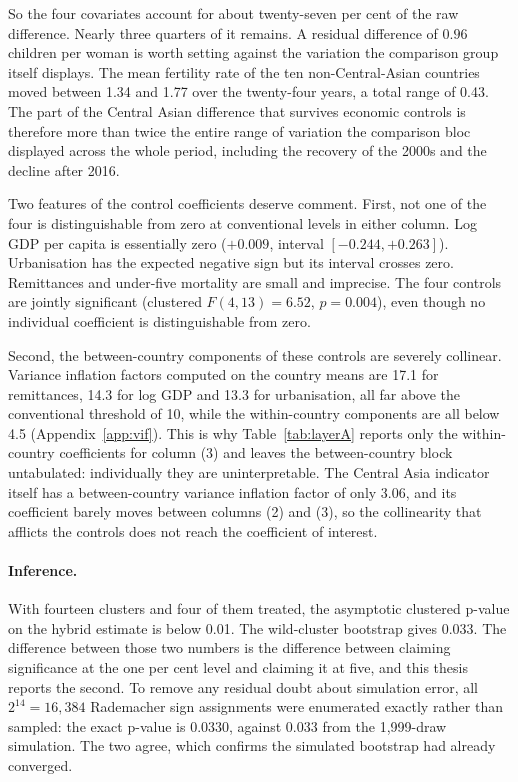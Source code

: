 So the four covariates account for about twenty-seven per cent of the raw difference. Nearly three quarters of it remains. A residual difference of $0.96$ children per woman is worth setting against the variation the comparison group itself displays. The mean fertility rate of the ten non-Central-Asian countries moved between 1.34 and 1.77 over the twenty-four years, a total range of 0.43. The part of the Central Asian difference that survives economic controls is therefore more than twice the entire range of variation the comparison bloc displayed across the whole period, including the recovery of the 2000s and the decline after 2016.

Two features of the control coefficients deserve comment. First, not one of the four is distinguishable from zero at conventional levels in either column. Log GDP per capita is essentially zero ($+0.009$, interval $[-0.244, +0.263]$). Urbanisation has the expected negative sign but its interval crosses zero. Remittances and under-five mortality are small and imprecise. The four controls are jointly significant (clustered $F(4, 13) = 6.52$, $p = 0.004$), even though no individual coefficient is distinguishable from zero.

Second, the between-country components of these controls are severely collinear. Variance inflation factors computed on the country means are 17.1 for remittances, 14.3 for log GDP and 13.3 for urbanisation, all far above the conventional threshold of 10, while the within-country components are all below 4.5 (Appendix~\ref{app:vif}). This is why Table~\ref{tab:layerA} reports only the within-country coefficients for column (3) and leaves the between-country block untabulated: individually they are uninterpretable. The Central Asia indicator itself has a between-country variance inflation factor of only 3.06, and its coefficient barely moves between columns (2) and (3), so the collinearity that afflicts the controls does not reach the coefficient of interest.

\paragraph{Inference.} With fourteen clusters and four of them treated, the asymptotic clustered p-value on the hybrid estimate is below 0.01. The wild-cluster bootstrap gives 0.033. The difference between those two numbers is the difference between claiming significance at the one per cent level and claiming it at five, and this thesis reports the second. To remove any residual doubt about simulation error, all $2^{14} = 16{,}384$ Rademacher sign assignments were enumerated exactly rather than sampled: the exact p-value is 0.0330, against 0.033 from the 1{,}999-draw simulation. The two agree, which confirms the simulated bootstrap had already converged.

